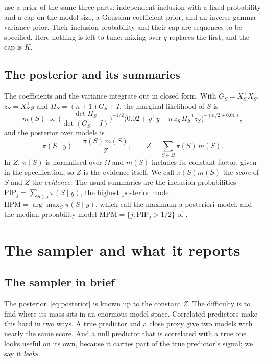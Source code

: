 \documentclass[11pt]{article}
\newcommand{\Om}{\Omega}
\newcommand{\pis}[1]{\pi(#1\mid y)}
\newcommand{\PIP}{\mathrm{PIP}}
\newcommand{\HPM}{\mathrm{HPM}}
\newcommand{\MPM}{\mathrm{MPM}}
\theoremstyle{plain}
\theoremstyle{definition}
\begin{document}
\citet{SongLiang2015} use a prior of the same three parts: independent inclusion with a fixed probability and a cap on
the model size, a Gaussian coefficient prior, and an inverse gamma variance prior. Their inclusion probability and their
cap are sequences to be specified. Here nothing is left to tune: mixing over $q$ replaces the first, and the
cap is $K$.

\subsection{The posterior and its summaries}\label{sec:posterior}

The coefficients and the variance integrate out in closed form. With $G_S=X_S^\top X_S$, $z_S=X_S^\top y$ and
$H_S=(n+1)G_S+I$, the marginal likelihood of $S$ is
\[
  m(S)\ \propto\ \Big(\frac{\det H_S}{\det(G_S+I)}\Big)^{-1/2}\big(0.02+y^\top y-n\,z_S^\top H_S^{-1}z_S\big)^{-(n/2+0.01)},
\]
and the posterior over models is
\begin{equation}\label{eq:posterior}
  \pis{S}=\frac{\pi(S)\,m(S)}{Z},\qquad Z=\sum_{S\in\Om}\pi(S)\,m(S).
\end{equation}
In $Z$, $\pi(S)$ is normalised over $\Om$ and $m(S)$ includes its constant factor, given in the specification, so $Z$ is the evidence itself. We call $\pi(S)m(S)$ the \emph{score} of $S$ and $Z$ the \emph{evidence}. The usual summaries are the inclusion
probabilities $\PIP_j=\sum_{S\ni j}\pis{S}$, the highest posterior model $\HPM=\arg\max_S\pis{S}$, which
\citet{SongLiang2015} call the maximum a posteriori model, and the median probability model $\MPM=\{j:\PIP_j>1/2\}$ of
\citet{BarbieriBerger2004}.

\section{The sampler and what it reports}\label{sec:sampler}

\subsection{The sampler in brief}\label{sec:steps}

The posterior~\eqref{eq:posterior} is known up to the constant $Z$. The difficulty is to find where its mass sits in an
enormous model space. Correlated predictors make this hard in two ways. A true predictor and a close proxy give two
models with nearly the same score. And a null predictor that is correlated with a true one looks useful on its own,
because it carries part of the true predictor's signal; we say it \emph{leaks}.
\end{document}
